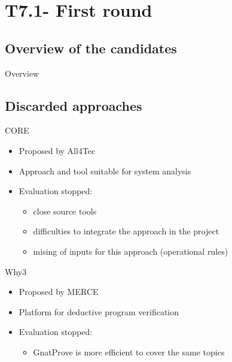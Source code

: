 
\section{T7.1- First round}

\subsection{Overview of the candidates}


\begin{frame}{Overview}
 
\begin{center}

 
\end{center}

\end{frame}


\subsection{Discarded approaches}


\begin{frame}{CORE}

\begin{itemize}
\item Proposed by All4Tec
\item Approach and tool suitable for system analysis
\item Evaluation stopped:

\begin{itemize}
\item close source tools
\item difficulties to integrate the approach in the project
\item mising of inputs for this approach (operational rules)
\end{itemize}
\end{itemize}
 

\end{frame}


\begin{frame}{Why3}
 
 
\begin{itemize}
\item Proposed by MERCE
\item Platform for deductive program verification
\item Evaluation stopped:
\begin{itemize}
\item GnatProve is more efficient to cover the same topics
\end{itemize}
\end{itemize}
 

\end{frame}


